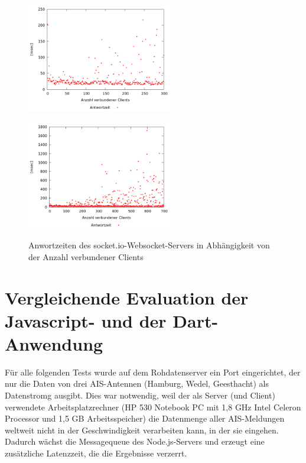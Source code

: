 \begin{figure}[H]
\begin{minipage}[hbt]{3in}
	\centering
	\includegraphics[width=2.5in]{images/stresstest300.png}
	\label{Stresstest300}
\end{minipage}
\hfill
\begin{minipage}[hbt]{3in}
	\centering
	\includegraphics[width=2.5in]{images/stresstest.png}
	\label{Stresstest}
\end{minipage}
\caption{Anwortzeiten des socket.io-Websocket-Servers in Abhängigkeit von der Anzahl verbundener Clients}
\label{Antwortzeiten socket.io}
\end{figure}
\section{Vergleichende Evaluation der Javascript- und der Dart-Anwendung}
Für alle folgenden Tests wurde auf dem Rohdatenserver ein Port eingerichtet, der nur die Daten von drei AIS-Antennen (Hamburg, Wedel, Geesthacht) als Datenstromg ausgibt. Dies war notwendig, weil der als Server (und Client) verwendete Arbeitsplatzrechner (HP 530 Notebook PC mit 1,8 GHz Intel Celeron Processor und 1,5 GB Arbeitsspeicher) die Datenmenge aller AIS-Meldungen weltweit nicht in der Geschwindigkeit verarbeiten kann, in der sie eingehen. Dadurch wächst die Messagequeue des Node.js-Servers und erzeugt eine zusätzliche Latenzzeit, die die Ergebnisse verzerrt.

